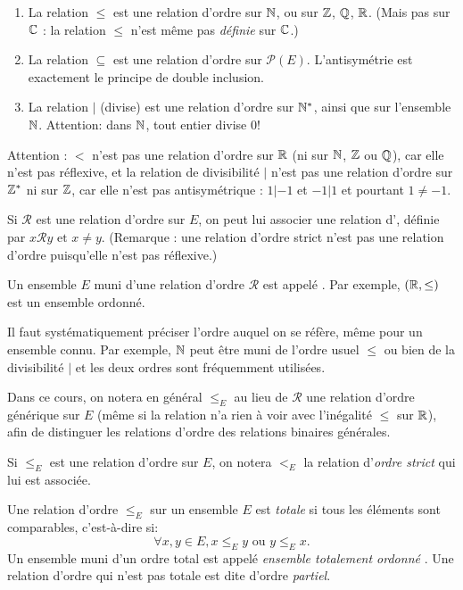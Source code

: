 \begin{exemples}
\begin{enumerate}[label=\alph*)]
\item La relation $\leq$ est une relation d'ordre sur $\mathbb{N}$, ou sur $\mathbb{Z}$, $\mathbb{Q}$, $\mathbb{R}$. (Mais pas sur $\mathbb{C}$ : la relation $\leq$ n'est même pas \emph{définie} sur $\mathbb{C}$.)
\item La relation $\subseteq$ est une relation d'ordre sur $\mathcal P(E)$. L'antisymétrie est exactement le principe de double inclusion.
\item La relation $|$ (\og divise\fg) est une relation d'ordre sur $\mathbb{N}^*$, ainsi que sur l'ensemble $\mathbb{N}$. Attention: dans $\mathbb{N}$, tout entier divise $0$! 
\end{enumerate}
\end{exemples}

Attention : $<$ n'est pas une relation d'ordre sur $\mathbb{R}$ (ni sur $\mathbb{N}$, $\mathbb{Z}$ ou $\mathbb{Q}$), car elle n'est pas réflexive, et la relation de divisibilité $|$ n'est pas une relation d'ordre sur $\mathbb{Z}^*$ ni sur $\mathbb{Z}$, car elle n'est pas antisymétrique : $1|-1$ et $-1|1$ et pourtant $1\neq -1$.

\begin{definition}
Si ${\mathcal R}$ est une relation d'ordre sur $E$, on peut lui associer une relation d'\emph{}, définie par \og$ x{\mathcal R}y\text{ et }x\neq y$\fg. (Remarque : une relation d'ordre strict n'est pas une relation d'ordre puisqu'elle n'est pas réflexive.)
\end{definition}

Un ensemble $E$ muni d'une relation d'ordre ${\mathcal R}$ est appelé \emph{}. Par exemple, $(\mathbb{R}, \leq)$ est un ensemble ordonné.

Il faut systématiquement préciser l'ordre auquel on se réfère, même pour un ensemble \og connu\fg. Par exemple, $\mathbb{N}$ peut être muni de l'ordre usuel $\leq$ ou bien de la divisibilité $|$ et les deux ordres sont fréquemment utilisées.

Dans ce cours, on notera en général $\leq_E$ au lieu de ${\mathcal R}$ une relation d'ordre générique sur $E$ (même si la relation n'a rien à voir avec l'inégalité $\leq$ sur $\mathbb{R}$), afin de distinguer les relations d'ordre des relations binaires générales.

Si $\leq_E$ est une relation d'ordre sur $E$, on notera $<_E$ la relation d'\emph{ordre strict} qui lui est associée.

\begin{definition}
Une relation d'ordre $\leq_E$ sur un ensemble $E$ est \emph{totale} si tous les éléments sont comparables, c'est-à-dire si:
\[ \forall x, y\in E, x\leq_Ey\text{ ou } y\leq_E x.\]
Un ensemble muni d'un ordre total est appelé \emph{ensemble totalement ordonné} . Une relation d'ordre qui n'est pas totale est dite d'ordre \emph{partiel}.
\end{definition}

